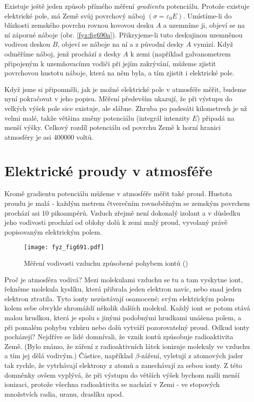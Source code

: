     Existuje ještě jeden způsob přímého měření \emph{gradientu} potenciálu. Protože existuje
    elektrické pole, má Země svůj povrchový náboj \((σ=\varepsilon_0E)\). Umístíme-li do blízkosti
    zemského povrchu rovnou kovovou desku \(A\) a uzemníme ji, objeví se na ní záporné náboje (obr.
    \ref{fyz:fig690a}). Přikryjeme-li tuto deskujinou uzemněnou vodivou deskou \(B\), objeví se
    náboje na ní a z původní desky \(A\) vymizí. Když odměříme náboj, jenž prochází z desky \(A\) k
    zemi (například galvanometrem připojeným k uzemňovacímu vodiči při jejím zakrývání, můžeme
    zjistit povrchovou hustotu náboje, která na něm byla, a tím zjistit i elektrické pole.

    Když jsme si připomněli, jak je možné elektrické pole v atmosféře měřit, budeme nyní pokračovat
    v jeho popisu. Měření především ukazují, že při výstupu do velkých výšek pole sice existuje, ale
    slábne. Zhruba po padesáti kilometrech je už velmi malé, takže většina změny potenciálu
    (integrál intenzity \(E\)) připadá na menší výšky. Celkový rozdíl potenciálu od povrchu Země k
    horní hranici atmosféry je asi \num{400000} voltů.

  \section{Elektrické proudy v atmosféře}\label{fyz:IIchapIXsecII}   
    Kromě gradientu potenciálu můžeme v atmosféře měřit také proud. Hustota proudu je malá - každým
    metrem čtverečním rovnoběžným se zemským povrchem prochází asi \num{10} pikoampérů. Vzduch
    zřejmě není dokonalý izolant a v důsledku jeho vodivosti prochází od oblohy dolů k zemi malý
    proud, vyvolaný právě popisovaným elektrickým polem.

    \begin{figure}[ht!] %
      \centering
      \texttt{[image: fyz\_fig691.pdf]}
      \caption{Měření vodivosti vzduchu způsobené pohybem iontů
               (\cite[s.~707]{Feynman02})}
      \label{fyz:fig691}
    \end{figure}

    Proč je atmosféra vodivá? Mezi molekulami vzduchu se tu a tam vyskytne iont, řekněme molekula
    kyslíku, která přibrala jeden elektron navíc, nebo snad jeden elektron ztratila. Tyto ionty
    nezůstávají osamocené; svým elektrickým polem kolem sebe obvykle shromáždí několik dalších
    molekul. Každý iont se potom stává malou hrudkou, která je spolu s jinými podobnými hrudkami
    unášena polem, a při pomalém pohybu vzhůru nebo dolů vytváří pozorovatelný proud. Odkud ionty
    pocházejí? Nejdříve se lidé domnívali, že vznik iontů způsobuje radioaktivita Země. (Bylo známo,
    že záření z radioaktivních látek ionizuje molekuly ve vzduchu a tím jej dělá vodivým.) Částice,
    například \(\beta\)-záření, vyletují z atomových jader tak rychle, že vytrhávají elektrony z
    atomů a zanechávají za sebou ionty. Z této domněnky ovšem vyplývá, že při výstupu do větších
    výšek bychom našli menší ionizaci, protože všechna radioaktivita se nachází v Zemi - ve
    stopových množstvích radia, uranu, draslíku apod.

